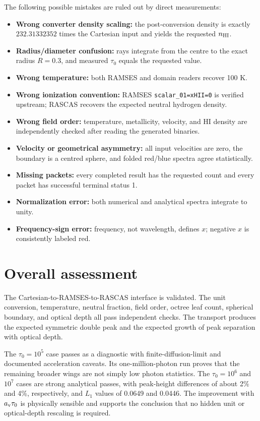 \documentclass[11pt,a4paper]{article}
\newcommand{\tauzero}{\tau_0}
\newcommand{\av}{a_{\rm v}}
\newcommand{\nhi}{n_{\rm HI}}
\begin{document}
The following possible mistakes are ruled out by direct measurements:
\begin{itemize}
\item \textbf{Wrong converter density scaling:} the post-conversion density is
exactly $232.31332352$ times the Cartesian input and yields the requested $\nhi$.
\item \textbf{Radius/diameter confusion:} rays integrate from the centre to the
exact radius $R=0.3$, and measured $\tauzero$ equals the requested value.
\item \textbf{Wrong temperature:} both RAMSES and domain readers recover 100 K.
\item \textbf{Wrong ionization convention:} RAMSES \texttt{scalar\_01=xHII=0}
is verified upstream; RASCAS recovers the expected neutral hydrogen density.
\item \textbf{Wrong field order:} temperature, metallicity, velocity, and HI
density are independently checked after reading the generated binaries.
\item \textbf{Velocity or geometrical asymmetry:} all input velocities are zero,
the boundary is a centred sphere, and folded red/blue spectra agree statistically.
\item \textbf{Missing packets:} every completed result has the requested count
and every packet has successful terminal status 1.
\item \textbf{Normalization error:} both numerical and analytical spectra
integrate to unity.
\item \textbf{Frequency-sign error:} frequency, not wavelength, defines $x$;
negative $x$ is consistently labeled red.
\end{itemize}

\section{Overall assessment}

The Cartesian-to-RAMSES-to-RASCAS interface is validated.  The unit conversion,
temperature, neutral fraction, field order, octree leaf count, spherical
boundary, and optical depth all pass independent checks.  The transport produces
the expected symmetric double peak and the expected growth of peak separation
with optical depth.

The $\tauzero=10^5$ case passes as a diagnostic with finite-diffusion-limit and
documented acceleration caveats.  Its one-million-photon run proves that the
remaining broader wings are not simply low photon statistics.  The
$\tauzero=10^6$ and $10^7$ cases are strong analytical passes, with peak-height
differences of about 2\% and 4\%, respectively, and $L_1$ values of 0.0649 and
0.0446.  The improvement with $\av\tauzero$ is physically sensible and supports
the conclusion that no hidden unit or optical-depth rescaling is required.
\end{document}
